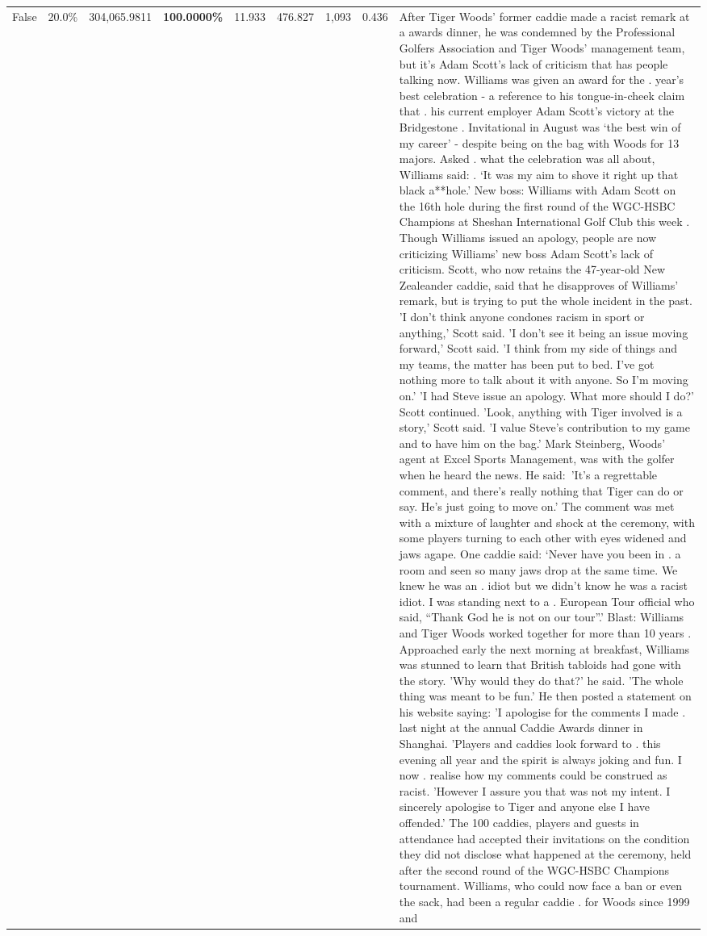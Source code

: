 \begin{table}[H]
\begin{tabular}{lllrlllll}
False & 20.0\% & 304,065.9811 & \bfseries \color{red} 100.0000\% & 11.933 & 476.827 & 1,093 & 0.436 & After Tiger Woods' former caddie made a racist remark at a awards dinner, he was condemned by the Professional Golfers Association and Tiger Woods' management team, but it's Adam Scott's lack of criticism that has people talking now. Williams was given an award for the . year’s best celebration - a reference to his tongue-in-cheek claim that . his current employer Adam Scott’s victory at the Bridgestone . Invitational in August was ‘the best win of my career’ - despite being on the bag with Woods for 13 majors. Asked . what the celebration was all about, Williams said: . ‘It was my aim to shove it right up that black a**hole.’ New boss: Williams with Adam Scott  on the 16th hole during the first round of the WGC-HSBC Champions at Sheshan International Golf Club this week . Though Williams issued an apology, people are now criticizing Williams' new boss Adam Scott's lack of criticism. Scott, who now retains the 47-year-old New Zealeander caddie, said that he disapproves of Williams' remark, but is trying to put the whole incident in the past. 'I don't think anyone condones racism in sport or anything,' Scott said. 'I don't see it being an issue moving forward,' Scott said. 'I think from my side of things and my teams, the matter has been put to bed. I've got nothing more to talk about it with anyone. So I'm moving on.' 'I had Steve issue an apology. What more should I do?' Scott continued. 'Look, anything with Tiger involved is a story,' Scott said. 'I value Steve's contribution to my game and to have him on the bag.' Mark Steinberg, Woods' agent at Excel Sports Management, was with the golfer when he heard the news. He said: 'It's a regrettable comment, and there's really nothing that Tiger can do or say. He's just going to move on.' The comment was met with a mixture of laughter and shock at the ceremony, with some players turning to each other with eyes widened and jaws agape. One caddie said: ‘Never have you been in . a room and seen so many jaws drop at the same time. We knew he was an . idiot but we didn’t know he was a racist idiot. I was standing next to a . European Tour official who said, “Thank God he is not on our tour”.’ Blast: Williams and Tiger Woods worked together for more than 10 years . Approached early the next morning at breakfast, Williams was stunned to learn that British tabloids had gone with the story. 'Why would they do that?' he said. 'The whole thing was meant to be fun.' He then posted a statement on his website saying: 'I apologise for the comments I made . last night at the annual Caddie Awards dinner in Shanghai. 'Players and caddies look forward to . this evening all year and the spirit is always joking and fun. I now . realise how my comments could be construed as racist. 'However I assure you that was not my intent. I sincerely apologise to Tiger and anyone else I have offended.' The 100 caddies, players and guests in attendance had accepted their invitations on the condition they did not disclose what happened at the ceremony, held after the second round of the WGC-HSBC Champions tournament. Williams, who could now face a ban or even the sack, had been a regular caddie . for Woods since 1999 and 
\end{tabular}
\end{table}
